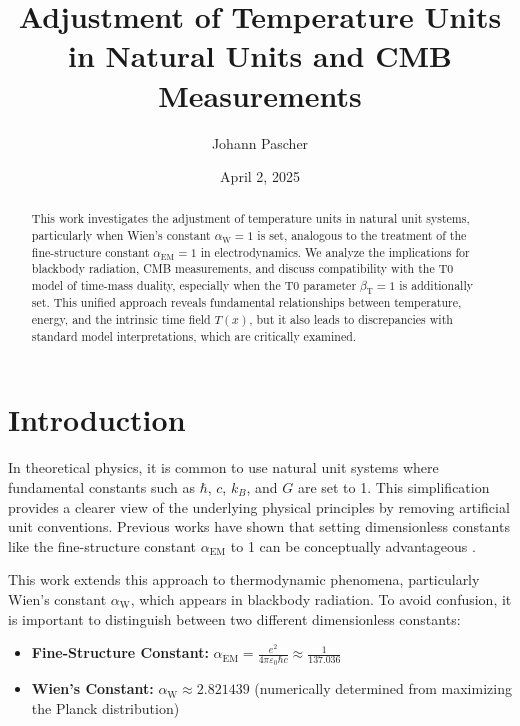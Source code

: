 \documentclass[12pt,a4paper]{article}
\newcommand{\Tfield}{T(x)}
\newcommand{\betaT}{\beta_{\text{T}}}
\newcommand{\alphaEM}{\alpha_{\text{EM}}}
\newcommand{\alphaW}{\alpha_{\text{W}}}
\begin{document}
	
	\title{Adjustment of Temperature Units in Natural Units and CMB Measurements}
	\author{Johann Pascher}
	\date{April 2, 2025}
	
	\maketitle
	
	\begin{abstract}
		This work investigates the adjustment of temperature units in natural unit systems, particularly when Wien's constant \(\alphaW = 1\) is set, analogous to the treatment of the fine-structure constant \(\alphaEM = 1\) in electrodynamics. We analyze the implications for blackbody radiation, CMB measurements, and discuss compatibility with the T0 model of time-mass duality, especially when the T0 parameter \(\betaT = 1\) is additionally set. This unified approach reveals fundamental relationships between temperature, energy, and the intrinsic time field \(\Tfield\), but it also leads to discrepancies with standard model interpretations, which are critically examined.
	\end{abstract}
	
	\tableofcontents
	\newpage
	
	\section{Introduction}
	
	In theoretical physics, it is common to use natural unit systems where fundamental constants such as \(\hbar\), \(c\), \(k_B\), and \(G\) are set to 1. This simplification provides a clearer view of the underlying physical principles by removing artificial unit conventions. Previous works have shown that setting dimensionless constants like the fine-structure constant \(\alphaEM\) to 1 can be conceptually advantageous \cite{pascher_alpha_2025}.
	
	This work extends this approach to thermodynamic phenomena, particularly Wien's constant \(\alphaW\), which appears in blackbody radiation. To avoid confusion, it is important to distinguish between two different dimensionless constants:
	
	\begin{tcolorbox}[colback=blue!5!white,colframe=blue!75!black,title=Key Dimensionless Constants]
		\begin{itemize}
			\item \textbf{Fine-Structure Constant:} \(\alphaEM = \frac{e^2}{4\pi\varepsilon_0 \hbar c} \approx \frac{1}{137.036}\)
			\item \textbf{Wien's Constant:} \(\alphaW \approx 2.821439\) (numerically determined from maximizing the Planck distribution)
		\end{itemize}
	\end{tcolorbox}
	
\end{document}
